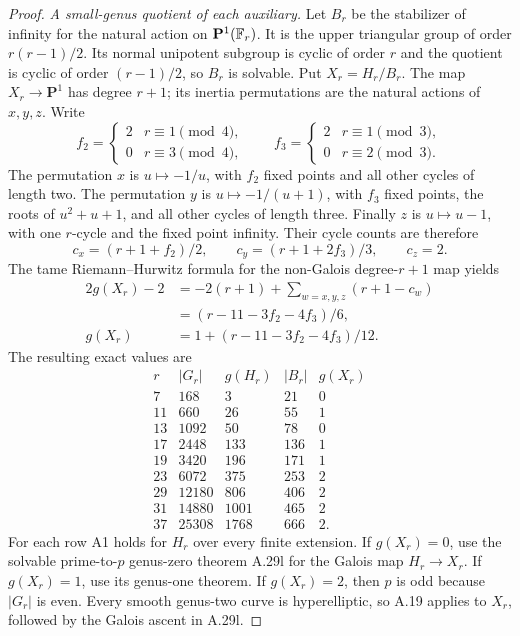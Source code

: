 \begin{proof}
\emph{A small-genus quotient of each auxiliary.}
Let $B_r$ be the stabilizer of infinity for the natural
action on $\mathbf P^1(\mathbb F_r)$. It is the upper triangular
group of order $r(r-1)/2$. Its normal unipotent subgroup
is cyclic of order $r$ and the quotient is cyclic of
order $(r-1)/2$, so $B_r$ is solvable. Put $X_r=H_r/B_r$.
The map $X_r\to\mathbf P^1$ has degree $r+1$; its
inertia permutations are the natural actions of $x,y,z$.
Write
\[
 f_2=\begin{cases}2&r\equiv1\pmod4,\\0&r\equiv3\pmod4,
       \end{cases}
 \qquad
 f_3=\begin{cases}2&r\equiv1\pmod3,\\0&r\equiv2\pmod3.
       \end{cases}
\]
The permutation $x$ is $u\mapsto-1/u$, with $f_2$
fixed points and all other cycles of length two.
The permutation $y$ is $u\mapsto-1/(u+1)$, with
$f_3$ fixed points, the roots of $u^2+u+1$, and all
other cycles of length three. Finally $z$ is
$u\mapsto u-1$, with one $r$-cycle and the fixed
point infinity. Their cycle counts are therefore
\[
 c_x=(r+1+f_2)/2,\qquad
 c_y=(r+1+2f_3)/3,\qquad c_z=2.
\]
The tame Riemann--Hurwitz formula for the non-Galois
degree-$r+1$ map yields
\[
\begin{aligned}
 2g(X_r)-2
 &=-2(r+1)+\sum_{w=x,y,z}(r+1-c_w)\\
 &=(r-11-3f_2-4f_3)/6,\\
 g(X_r)&=1+(r-11-3f_2-4f_3)/12.
\end{aligned}
\]
The resulting exact values are
\[
\begin{array}{c|r|r|r|c}
 r&|G_r|&g(H_r)&|B_r|&g(X_r)\\\hline
 7&168&3&21&0\\
 11&660&26&55&1\\
 13&1092&50&78&0\\
 17&2448&133&136&1\\
 19&3420&196&171&1\\
 23&6072&375&253&2\\
 29&12180&806&406&2\\
 31&14880&1001&465&2\\
 37&25308&1768&666&2.
\end{array}
\]
For each row A1 holds for $H_r$ over every finite
extension. If $g(X_r)=0$, use the solvable
prime-to-$p$ genus-zero theorem A.29l for the Galois
map $H_r\to X_r$. If $g(X_r)=1$, use its genus-one
theorem. If $g(X_r)=2$, then $p$ is odd because
$|G_r|$ is even. Every smooth genus-two curve is
hyperelliptic, so A.19 applies to $X_r$, followed
by the Galois ascent in A.29l.


\end{proof}
